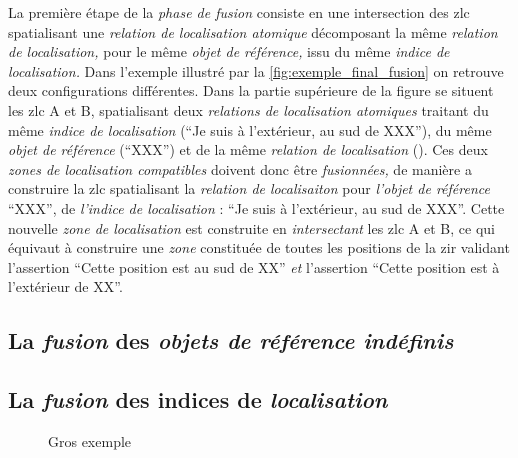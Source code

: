 La première étape de la \emph{phase de fusion} consiste en une
intersection des \ac{zlc} spatialisant une \emph{relation de
  localisation atomique} décomposant la même \emph{relation de
  localisation,} pour le même \emph{objet de référence,} issu du même
\emph{indice de localisation.} Dans l'exemple illustré par la
\autoref{fig:exemple_final_fusion} on retrouve deux configurations
différentes. Dans la partie supérieure de la figure se situent les
\ac{zlc} \textcolor{RdBu-9-1}{\textsf{A}} et
\textcolor{RdBu-9-3}{\textsf{B}}, spatialisant deux \emph{relations de
  localisation atomiques} traitant du même \emph{indice de
  localisation} (\enquote{Je suis à l'extérieur, au sud de XXX}), du
même \emph{objet de référence} (\enquote{XXX}) et de la même
\emph{relation de localisation}
(). Ces deux \emph{zones de
  localisation compatibles} doivent donc être \emph{fusionnées,} de
manière a construire la \ac{zlc} spatialisant la \emph{relation de
  localisaiton}  pour
\emph{l'objet de référence} \enquote{XXX}, de \emph{l'indice de
  localisation} : \enquote{Je suis à l'extérieur, au sud de
  XXX}. Cette nouvelle \emph{zone de localisation} est construite en
\emph{intersectant} les \ac{zlc} \textcolor{RdBu-9-1}{\textsf{A}} et
\textcolor{RdBu-9-3}{\textsf{B}}, ce qui équivaut à construire une
\emph{zone} constituée de toutes les positions de la \ac{zir} validant
l'assertion \enquote{Cette position est au sud de XX} \emph{et}
l'assertion \enquote{Cette position est à l'extérieur de XX}.

\subsection{La \emph{fusion} des \emph{objets de référence indéfinis}}

\subsection{La \emph{fusion} des indices de \emph{localisation}}


\begin{landscape}
  \begin{figure}[H]
    \centering
    
    \caption{Gros exemple}
    \label{fig:exemple_final_fusion}
  \end{figure}
\end{landscape}


